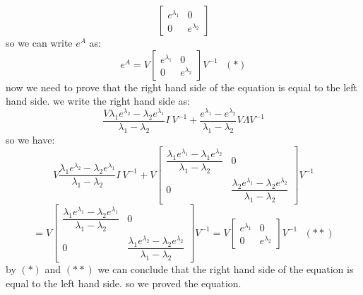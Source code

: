\begin{qsolve}
\begin{qsolve}[]
$$\begin{bmatrix}
			e^{\lambda_1} & 0\\
			0 & e^{\lambda_2}
		\end{bmatrix}$$
		so we can write $e^A$ as:
		$$e^A = V \begin{bmatrix}
			e^{\lambda_1} & 0\\
			0 & e^{\lambda_2}
		\end{bmatrix} V^{-1}\ \ \ (\ast)$$
		now we need to prove that the right hand side of the equation is equal to the left hand side. we write the right hand side as:
		$$\dfrac{V \lambda_1 e^ {\lambda_2} - \lambda_2 e^{\lambda_1}}{\lambda_1 - \lambda_2}I\ V^{-1} +\dfrac{e^{\lambda_1} - e^{\lambda_2}}{\lambda_1 - \lambda_2}V \Lambda V^{-1}$$
		so we have:
		$$V \dfrac{\lambda_1 e^ {\lambda_2} - \lambda_2 e^{\lambda_1}}{\lambda_1 - \lambda_2}I\ V^{-1} + V \begin{bmatrix}
			\dfrac{\lambda_1 e^ {\lambda_1} - \lambda_1 e^{\lambda_2}}{\lambda_1 - \lambda_2} & 0\\
			0 & \dfrac{\lambda_2 e^ {\lambda_1} - \lambda_2 e^{\lambda_2}}{\lambda_1 - \lambda_2}
		\end{bmatrix} V^{-1}$$
		$$ = V \begin{bmatrix}
			\dfrac{\lambda_1 e^ {\lambda_1} - \lambda_2 e^{\lambda_1}}{\lambda_1 - \lambda_2} & 0\\
			0 & \dfrac{\lambda_1 e^ {\lambda_2} - \lambda_2 e^{\lambda_2}}{\lambda_1 - \lambda_2}
		\end{bmatrix} V^{-1} = V \begin{bmatrix}
			e^{\lambda_1} & 0\\
			0 & e^{\lambda_2}
		\end{bmatrix} V^{-1} \ \ \ (\ast \ast) $$
		by $(\ast)$ and $(\ast \ast)$ we can conclude that the right hand side of the equation is equal to the left hand side. so we proved the equation.
	\end{qsolve}
\end{qsolve}
